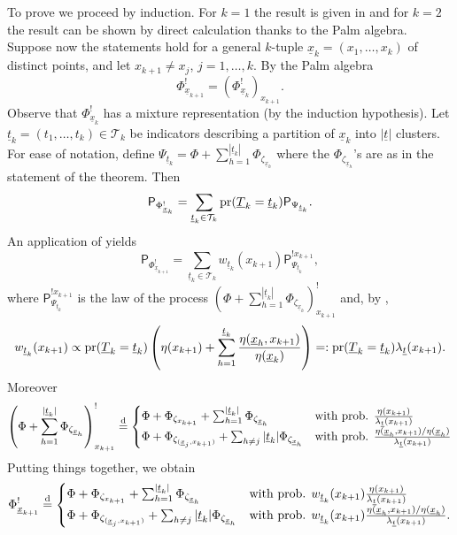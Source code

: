 \documentclass[11pt,a4paper,oneside]{article}
\newcommand{\deq}{\stackrel{\mbox{\scriptsize d}}{=}}
\newcommand{\calT}{\mathcal{T}}
\newcommand{\plaw}{\mathsf{P}}
\newcommand{\prob}{{\rm pr}}
\theoremstyle{definition}
\theoremstyle{remark}
\begin{document}
To prove  we proceed by induction. For $k=1$ the result is given in \cite{Mo03Cox} and for $k=2$ the result can be shown by direct calculation thanks to the Palm algebra. Suppose now the statements hold for a general $k$-tuple 
$\underline{x}_k = (x_1, \ldots, x_k)$ of distinct points, and let $x_{k+1} \neq x_j$, $j = 1, \ldots, k$. By the Palm algebra
\[
    \Phi^!_{\underline{x}_{k+1}} = (\Phi^!_{\underline{x}_k})_{x_{k+1}}.
\]
Observe that $\Phi^!_{\underline{x}_{k}}$ has a mixture representation (by the induction hypothesis). Let $\underline{t}_k = (t_1, \ldots, t_k) \in \calT_k$ be indicators describing a partition of $\underline{x}_k$ into $|\underline{t}|$ clusters. For ease of notation, define $\Psi_{\underline{t}_k} = \Phi + \sum_{h=1}^{|\underline{t}_k|} \Phi_{\zeta_{\underline{x}_h}}$ where the $\Phi_{\zeta_{\underline{x}_h}}$'s are as in the statement of the theorem. Then
\[
    \plaw_{\Phi^!_{\underline{x}_k}} = \sum_{\underline{t}_k \in \calT_k} \prob(\underline{T}_k = \underline{t}_k)  \plaw_{\Psi_{\underline{t}_k}}.
\]
An application of  yields
\[
    \plaw_{\Phi^!_{\underline{x}_{k+1}}} =  \sum_{\underline{t}_k \in \calT_k} w_{\underline{t}_k}(x_{k+1})  \plaw^{! x_{k+1}}_{\Psi_{\underline{t}_k}},
\]
where $\plaw^{!x_{k+1}}_{\Psi_{\underline{t}_k}}$ is the law of the process $\left(\Phi + \sum_{h=1}^{|\underline{t}_k|} \Phi_{\zeta_{\underline{x}_h}}\right)^!_{x_{k+1}}$ and, by ,
\[
    w_{\underline{t}_k}(x_{k+1}) \propto \prob(\underline{T}_k = \underline{t}_k) \left(\eta(x_{k+1}) + \sum_{h=1}^{\underline{t}_k} \frac{\eta(\underline{x}_h, x_{k+1})}{\eta(\underline{x}_k)} \right) =: \prob(\underline{T}_k = \underline{t}_k) \lambda_{\underline{t}}(x_{k+1}) .
\]
Moreover
\[
  \left(\Phi + \sum_{h=1}^{|\underline{t}_k|} \Phi_{\zeta_{\underline{x}_h}}\right)^!_{x_{k+1}} \deq \begin{cases}
      \Phi + \Phi_{\zeta_{x_{k+1}}} + \sum_{h=1}^{|\underline{t}_k|} \Phi_{\zeta_{\underline{x}_h}} & \text{with prob. } \frac{\eta(x_{k+1})}{\lambda_{\underline{t}}(x_{k+1})} \\
      \Phi + \Phi_{\zeta_{(\underline{x}_j, x_{k+1})}} + \sum_{h \neq j} {|\underline{t}_k|} \Phi_{\zeta_{\underline{x}_h}}  & \text{with prob. } \frac{\eta(\underline{x}_h, x_{k+1}) / \eta (\underline{x}_h)}{\lambda_{\underline{t}}(x_{k+1})}
  \end{cases}  
\]
Putting things together, we obtain
\[
    \Phi^!_{\underline{x}_{k+1}} \deq 
    \begin{cases}
        \Phi + \Phi_{\zeta_{x_{k+1}}} + \sum_{h=1}^{|\underline{t}_k|} \Phi_{\zeta_{\underline{x}_h}} & \text{with prob. }  w_{\underline{t}_k}(x_{k+1}) \frac{\eta(x_{k+1})}{\lambda_{\underline{t}}(x_{k+1})}  \\
        \Phi + \Phi_{\zeta_{(\underline{x}_j, x_{k+1})}} + \sum_{h \neq j} {|\underline{t}_k|} \Phi_{\zeta_{\underline{x}_h}}  & \text{with prob. } w_{\underline{t}_k}(x_{k+1})  \frac{\eta(\underline{x}_h, x_{k+1}) / \eta (\underline{x}_h)}{\lambda_{\underline{t}}(x_{k+1})}.
    \end{cases}
\]
\end{document}

